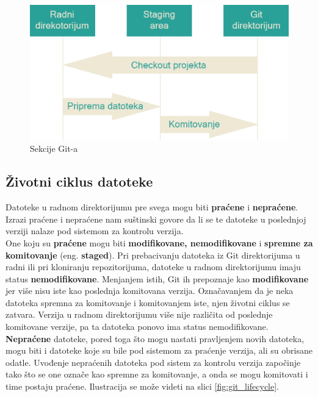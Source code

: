 \documentclass[a4paper]{article}
\begin{document}
{\begin{figure}[h!]
\begin{center}
\includegraphics[scale=0.19]{images/sekcije.png}
\end{center}
\caption{Sekcije Git-a}
\label{fig:git_sekcije}
\end{figure}



\subsection{Životni ciklus datoteke}
\label{subsec:ciklus}
Datoteke u radnom direktorijumu pre svega mogu biti \textbf{praćene} i \textbf{nepraćene}. Izrazi praćene i nepraćene nam suštinski govore da li se te datoteke u poslednjoj verziji nalaze pod sistemom za kontrolu verzija.\\
One koju su \textbf{praćene} mogu biti \textbf{modifikovane, nemodifikovane} i \textbf{spremne za komitovanje }(eng. \textbf{staged}). Pri prebacivanju datoteka iz Git direktorijuma u radni ili pri kloniranju repozitorijuma, datoteke u radnom direktorijumu imaju status \textbf{nemodifikovane}. Menjanjem istih, Git ih prepoznaje kao \textbf{modifikovane} jer više nisu iste kao poslednja komitovana verzija. Označavanjem da je neka datoteka spremna za komitovanje i komitovanjem iste, njen životni ciklus se zatvara. Verzija u radnom direktorijumu više nije različita od poslednje komitovane verzije, pa ta datoteka ponovo ima status nemodifikovane.
\textbf{Nepraćene} datoteke, pored toga što mogu nastati pravljenjem novih datoteka, mogu biti i datoteke koje su bile pod sistemom za praćenje verzija, ali su obrisane odatle. Uvođenje nepraćenih datoteka pod sistem za kontrolu verzija započinje tako što se one označe kao spremne za komitovanje, a onda se mogu komitovati i time postaju praćene.
Ilustracija se može videti na slici \ref{fig:git_lifecycle}.

}
\end{document}
